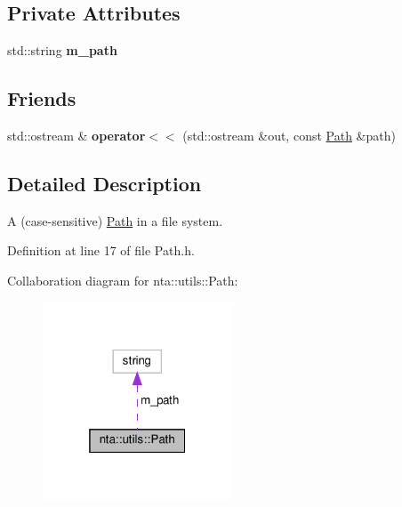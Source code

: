 \subsection*{Private Attributes}
\begin{DoxyCompactItemize}
\item 
\mbox{\label{classnta_1_1utils_1_1Path_af858cf7caff9965fe406011e56818884}} 
std\+::string {\bfseries m\+\_\+path}
\end{DoxyCompactItemize}
\subsection*{Friends}
\begin{DoxyCompactItemize}
\item 
\mbox{\label{classnta_1_1utils_1_1Path_ac7fb093b2a174ecaf6de71271bbabe56}} 
std\+::ostream \& {\bfseries operator$<$$<$} (std\+::ostream \&out, const \hyperlink{classnta_1_1utils_1_1Path}{Path} \&path)
\end{DoxyCompactItemize}


\subsection{Detailed Description}
A (case-\/sensitive) \hyperlink{classnta_1_1utils_1_1Path}{Path} in a file system. 

Definition at line 17 of file Path.\+h.



Collaboration diagram for nta\+:\+:utils\+:\+:Path\+:
\nopagebreak
\begin{figure}[H]
\begin{center}
\leavevmode
\includegraphics[width=160pt]{d4/d5a/classnta_1_1utils_1_1Path__coll__graph}
\end{center}
\end{figure}


